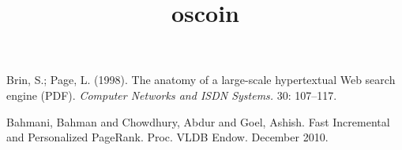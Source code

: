 \documentclass[10pt]{amsart}
\begin{document}
\title{oscoin}

\maketitle




\begin{thebibliography}{9}

 Brin, S.; Page, L. (1998). The anatomy of a
  large-scale hypertextual Web search engine (PDF). \emph{Computer Networks
  and ISDN Systems.} 30: 107–117.

 Bahmani, Bahman and Chowdhury, Abdur and Goel,
  Ashish. Fast Incremental and Personalized PageRank. Proc. VLDB
  Endow. December 2010.

\end{thebibliography}
\end{document}
